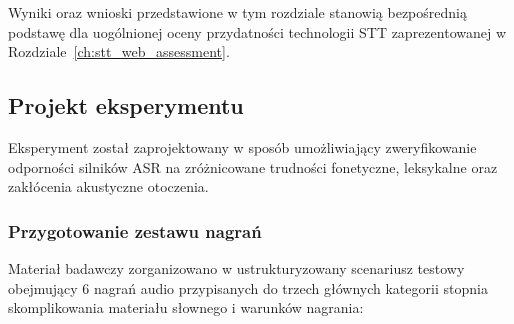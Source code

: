 Wyniki oraz wnioski przedstawione w tym rozdziale stanowią bezpośrednią podstawę dla uogólnionej oceny przydatności technologii STT zaprezentowanej w Rozdziale~\ref{ch:stt_web_assessment}.
\subsection{Projekt eksperymentu}
\label{subsec:experiment_design}

Eksperyment został zaprojektowany w sposób umożliwiający zweryfikowanie odporności silników ASR na zróżnicowane trudności fonetyczne, leksykalne oraz zakłócenia akustyczne otoczenia.

\subsubsection{Przygotowanie zestawu nagrań}
\label{subsubsec:dataset_preparation}

Materiał badawczy zorganizowano w ustrukturyzowany scenariusz testowy obejmujący 6 nagrań audio przypisanych do trzech głównych kategorii stopnia skomplikowania materiału słownego i warunków nagrania:

